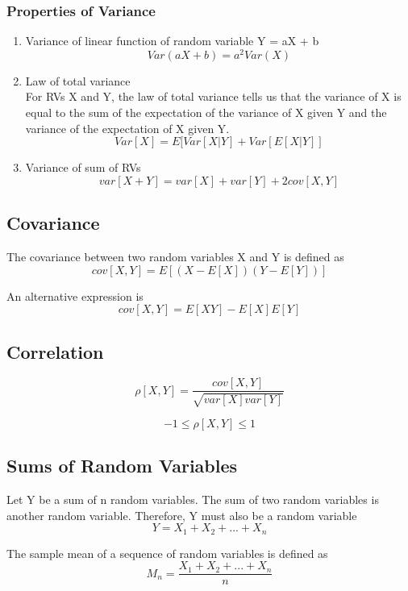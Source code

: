 \documentclass{article}
\begin{document}
\subsubsection{Properties of Variance}
\begin{enumerate}
    \item Variance of linear function of random variable Y = aX + b \\
    $$Var(aX + b) = a^2Var(X)$$

    \item Law of total variance \\ 
    For RVs X and Y, the law of total variance tells us that the variance of X is equal to the sum of the expectation of the variance of X given Y and the variance of the expectation of X given Y.
    $$Var[X] = E[Var[X|Y] + Var[E[X|Y]]$$ 

    \item Variance of sum of RVs \\

    $$var[X + Y] = var[X] + var[Y] + 2cov[X,Y]$$
    
\end{enumerate}

\subsection{Covariance}
The covariance between two random variables X and Y is defined as 
$$cov[X, Y] = E[(X - E[X])(Y - E[Y])]$$

An alternative expression is 
$$cov[X, Y] = E[XY] - E[X]E[Y]$$

\subsection{Correlation}

$$\rho[X, Y] = \frac{cov[X, Y]}{\sqrt{var[X]var[Y]}}$$

$$-1 \leq \rho[X, Y] \leq 1$$

\subsection{Sums of Random Variables}

Let Y be a sum of n random variables. The sum of two random variables is another random variable. Therefore, Y must also be a random variable
$$Y = X_1 + X_2 + ... + X_n$$

The sample mean of a sequence of random variables is defined as 
$$M_n = \frac{X_1 + X_2 + ... + X_n}{n}$$
\end{document}
